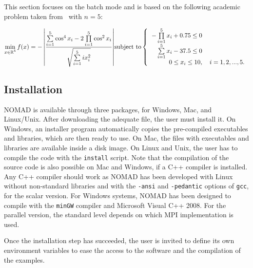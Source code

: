 \documentclass[12pt,english]{article}
\def\R{{\mathbb{R}}}
\newcommand{\nomad}{NOMAD\xspace}
\begin{document}
 This section focuses on the batch mode and is based on the following
   academic problem taken from~\cite{HeFu06} with $n=5$:

\bigskip

\begin{equation}
  \min\limits_{
      \begin{subarray}{c}
        x \in  \R^5
      \end{subarray}
    } f(x)=- \left|   \frac{\sum\limits_{i=1}^{5}\cos^{4} x_{i} -
              2 \prod\limits_{i=1}^{5} \cos^{2}x_{i}}
              {\sqrt{\sum\limits_{i=1}^{5}ix_{i}^{2}}}   \right|$$

   $$\mbox{subject to} \left\{\begin{tabular}{rl}
     $-\prod\limits_{i=1}^{5}x_{i}+0.75 \leq 0$ \\
     $\sum\limits_{i=1}^{5}x_{i}-37.5\leq 0$ \\
     $0 \leq x_i \leq 10$,& $i=1,2,...,5$.
     \end{tabular}
   \right.
\label{ex-problem}
\end{equation}

  \subsection*{Installation}

  \nomad is available through three packages, for Windows, Mac, and Linux/Unix.
  After downloading the adequate file, the user must install it.
  On Windows, an installer program automatically
   copies the pre-compiled executables and libraries, which are then ready to use.
  On Mac, the files with executables and libraries are available inside
    a disk image.
   On Linux and Unix, the user has to compile the code with the \texttt{install}
   script.
  Note that the compilation of the source code is also possible on Mac and Windows,
    if a C++ compiler is installed.
  Any C++ compiler should work
    as \nomad has been developed with Linux
    without non-standard libraries and with the \texttt{-ansi} and \texttt{-pedantic}
    options of \texttt{gcc}, for the scalar version.
  For Windows systems, \nomad has been designed to compile with
    the \texttt{minGW} compiler and Microsoft Visual C++ 2008.
  For the parallel version, the standard level depends on which MPI implementation
    is used.

  Once the installation step has succeeded, the user is invited to define its
    own environment
    variables to ease the access to the software
    and the compilation of the examples.
\end{document}
